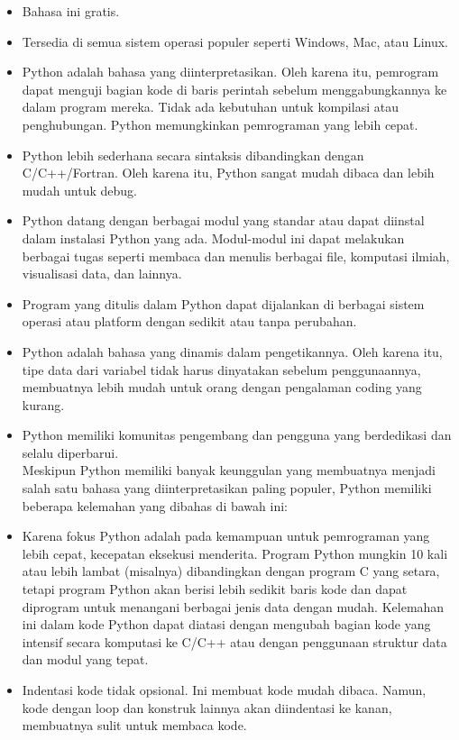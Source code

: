 \documentclass[
  letterpaper,
  DIV=11,
  numbers=noendperiod]{scrreprt}
\providecommand{\tightlist}{%
  \setlength{\itemsep}{0pt}\setlength{\parskip}{0pt}}\usepackage{longtable,booktabs,array}
\begin{document}
\begin{itemize}
\tightlist
\item
  Bahasa ini gratis.\\
\item
  Tersedia di semua sistem operasi populer seperti Windows, Mac, atau
  Linux.\\
\item
  Python adalah bahasa yang diinterpretasikan. Oleh karena itu,
  pemrogram dapat menguji bagian kode di baris perintah sebelum
  menggabungkannya ke dalam program mereka. Tidak ada kebutuhan untuk
  kompilasi atau penghubungan. Python memungkinkan pemrograman yang
  lebih cepat.\\
\item
  Python lebih sederhana secara sintaksis dibandingkan dengan
  C/C++/Fortran. Oleh karena itu, Python sangat mudah dibaca dan lebih
  mudah untuk debug.\\
\item
  Python datang dengan berbagai modul yang standar atau dapat diinstal
  dalam instalasi Python yang ada. Modul-modul ini dapat melakukan
  berbagai tugas seperti membaca dan menulis berbagai file, komputasi
  ilmiah, visualisasi data, dan lainnya.\\
\item
  Program yang ditulis dalam Python dapat dijalankan di berbagai sistem
  operasi atau platform dengan sedikit atau tanpa perubahan.\\
\item
  Python adalah bahasa yang dinamis dalam pengetikannya. Oleh karena
  itu, tipe data dari variabel tidak harus dinyatakan sebelum
  penggunaannya, membuatnya lebih mudah untuk orang dengan pengalaman
  coding yang kurang.\\
\item
  Python memiliki komunitas pengembang dan pengguna yang berdedikasi dan
  selalu diperbarui.\\
  Meskipun Python memiliki banyak keunggulan yang membuatnya menjadi
  salah satu bahasa yang diinterpretasikan paling populer, Python
  memiliki beberapa kelemahan yang dibahas di bawah ini:\\
\item
  Karena fokus Python adalah pada kemampuan untuk pemrograman yang lebih
  cepat, kecepatan eksekusi menderita. Program Python mungkin 10 kali
  atau lebih lambat (misalnya) dibandingkan dengan program C yang
  setara, tetapi program Python akan berisi lebih sedikit baris kode dan
  dapat diprogram untuk menangani berbagai jenis data dengan mudah.
  Kelemahan ini dalam kode Python dapat diatasi dengan mengubah bagian
  kode yang intensif secara komputasi ke C/C++ atau dengan penggunaan
  struktur data dan modul yang tepat.\\
\item
  Indentasi kode tidak opsional. Ini membuat kode mudah dibaca. Namun,
  kode dengan loop dan konstruk lainnya akan diindentasi ke kanan,
  membuatnya sulit untuk membaca kode.
\end{itemize}
\end{document}
